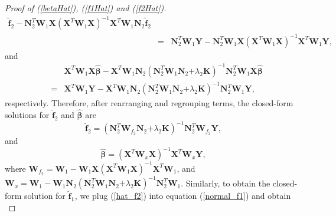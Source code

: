 \documentclass[review]{elsarticle}
\begin{document}
\begin{proof} [Proof of (\ref{betaHat}),  (\ref{f1Hat}) and  (\ref{f2Hat})]
\begin{eqnarray*}
\boldsymbol {\hat f}_2
-
\boldsymbol N_2^T  \boldsymbol W_1
\boldsymbol X 
(\boldsymbol X^T  \boldsymbol W_1\boldsymbol X)^{-1}  
\boldsymbol X^T  \boldsymbol W_1
\boldsymbol N_2 \boldsymbol {\hat f}_2 \\
&=&
\boldsymbol N_2^T  \boldsymbol W_1
\boldsymbol Y - \boldsymbol N_2^T  \boldsymbol W_1
\boldsymbol X 
(\boldsymbol X^T  \boldsymbol W_1\boldsymbol X)^{-1}  
\boldsymbol X^T  \boldsymbol W_1
\boldsymbol Y,
\end{eqnarray*}
and
\begin{eqnarray*}
&&
\boldsymbol X^T  \boldsymbol W_1
\boldsymbol X \boldsymbol {\hat \beta} 
- 
\boldsymbol X^T  \boldsymbol W_1
\boldsymbol N_2  
(\boldsymbol N_2^T  \boldsymbol W_1 \boldsymbol N_2 \boldsymbol 
 + \lambda_2 \boldsymbol K)^{-1}
  \boldsymbol N_2^T  \boldsymbol W_1 \boldsymbol X \boldsymbol {\hat \beta} \\
&=& 
\boldsymbol X^T  \boldsymbol W_1
\boldsymbol Y
-
\boldsymbol X^T  \boldsymbol W_1
\boldsymbol N_2  
(\boldsymbol N_2^T  \boldsymbol W_1 \boldsymbol N_2 \boldsymbol 
 + \lambda_2 \boldsymbol K)^{-1}
  \boldsymbol N_2^T  \boldsymbol W_1 \boldsymbol Y,
\end{eqnarray*}
respectively.
Therefore, after rearranging and regrouping terms, the closed-form solutions for $ \boldsymbol {\hat f}_2 $ and $\boldsymbol {\hat \beta}$ are
$$
 \boldsymbol {\hat f}_2 
 =  (\boldsymbol N_2^T  \boldsymbol W_{f_2} \boldsymbol N_2 \boldsymbol 
 + \lambda_2 \boldsymbol K)^{-1}
  \boldsymbol N_2^T  \boldsymbol W_{f_2} \boldsymbol Y,
$$
and
$$
\boldsymbol {\hat \beta} 
 = 
 (\boldsymbol X^T  \boldsymbol W_x \boldsymbol X )^{-1} \boldsymbol X^T  \boldsymbol W_x \boldsymbol Y,
$$
where  
$\boldsymbol W_{f_2}  =  \boldsymbol W_1 - \boldsymbol W_1\boldsymbol X(\boldsymbol X^T  \boldsymbol W_1\boldsymbol X)^{-1}  \boldsymbol X^T  \boldsymbol W_1$,
and
$\boldsymbol W_x =
 \boldsymbol W_1 
 -
\boldsymbol W_1 \boldsymbol N_2 
 (\boldsymbol N_2^T  \boldsymbol W_1 \boldsymbol N_2 \boldsymbol 
 + \lambda_2 \boldsymbol K)^{-1} 
 \boldsymbol N_2^T  \boldsymbol W_1$.
Similarly, to obtain the closed-form solution for $\boldsymbol {\hat f_1}$, we plug  (\ref{hat_f2}) into equation (\ref{normal_f1}) and obtain
\begin{equation} \label{normal_new_f1}

\end{equation}
\end{proof}
\end{document}
